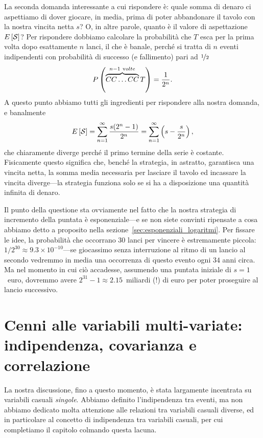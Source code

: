 La seconda domanda interessante a cui rispondere è: quale somma di denaro
ci aspettiamo di dover giocare, in media, prima di poter abbandonare il tavolo
con la nostra vincita netta $s$? O, in altre parole, quanto è il valore di
aspettazione $\displaystyle E\left[\mathcal{S}\right]$? Per rispondere dobbiamo calcolare la
probabilità che $T$ esca per la prima volta dopo esattamente $n$ lanci,
il che è banale, perché si tratta di $n$ eventi indipendenti con
probabilità di successo (e fallimento) pari ad $\nicefrac{1}{2}$
\begin{align*}
  \displaystyle P\left(\overbrace{CC\ldots CC}^{n - 1~{\mathrm volte}} T\right) = \frac{1}{2^n}.
\end{align*}
A questo punto abbiamo tutti gli ingredienti per rispondere alla nostra domanda,
e banalmente
\begin{align}
  \displaystyle E\left[\mathcal{S}\right] = \sum_{n = 1}^\infty \frac{s(2^n - 1)}{2^n} =
  \sum_{n = 1}^\infty \left( s - \frac{s}{2^n} \right),
\end{align}
che chiaramente diverge perché il primo termine della serie è costante.
Fisicamente questo significa che, benché la strategia, in astratto,
garantisca una vincita netta, la somma media necessaria per lasciare il tavolo
ed incassare la vincita diverge---la strategia funziona solo se si ha a
disposizione una quantità infinita di denaro.

Il punto della questione sta ovviamente nel fatto che la nostra strategia di
incremento della puntata è esponenziale---e se non siete convinti ripensate a
cosa abbiamo detto a proposito nella sezione~\ref{sec:esponenziali_logaritmi}.
Per fissare le idee, la probabilità che occorrano $30$ lanci per vincere
è estremamente piccola: $1/2^{30} \approx 9.3 \times 10^{-10}$---se giocassimo
senza interruzione al ritmo di un lancio al secondo vedremmo in media
una occorrenza di questo evento ogni $34$ anni circa. Ma nel momento in cui
ciò accadesse, assumendo una puntata iniziale di $s = 1$~euro, dovremmo avere
$2^{31} - 1 \approx 2.15$~miliardi (!) di euro per poter proseguire al lancio
successivo.


\section{Cenni alle variabili multi-variate: indipendenza, covarianza e correlazione}
\label{sec:covarianza}

La nostra discussione, fino a questo momento, è stata largamente incentrata
su variabili casuali \emph{singole}. Abbiamo definito l'indipendenza tra eventi,
ma non abbiamo dedicato molta attenzione alle relazioni tra variabili casuali
diverse, ed in particolare al concetto di indipendenza tra variabili casuali,
per cui completiamo il capitolo colmando questa lacuna.

